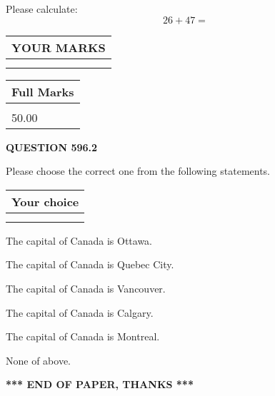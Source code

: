 \documentclass[12pt]{article}
\begin{document}
  
 
Please calculate:
\begin{equation}
26 +  %
47 = \nonumber
\end{equation}
 

 

 
  
\vspace{0.2in}
  
\noindent\begin{tabular}{|l|}
\hline
 YOUR MARKS  \\
\hline
 \\ 
 \\ 
\hline
\end{tabular}
\hspace{0.05in} \begin{tabular}{|l|}
\hline
 Full Marks  \\
\hline
 \\ 
50.00 \\
\hline
\end{tabular}
{\textbf{\Large{QUESTION
596.2 
}}}
  
  
Please choose the correct one from the following statements.
  
  
\noindent\hspace{3.0in} \begin{tabular}{|l|}
\hline
Your choice \\
\hline
 \\ 
 \\ 
\hline
\end{tabular}
  
  
 
 
The capital of Canada is Ottawa.
 
 
The capital of Canada is Quebec City.
 
 
The capital of Canada is Vancouver.
 
 
The capital of Canada is Calgary.
 
 
The capital of Canada is Montreal.
 
 
 None of above.
 
 
   
   
 \vspace{0.2in}
 
   
   
   
   
\vspace{1.0in} 
{\textbf{\large{ *** END OF PAPER, THANKS *** }}} 
   
\end{document}
